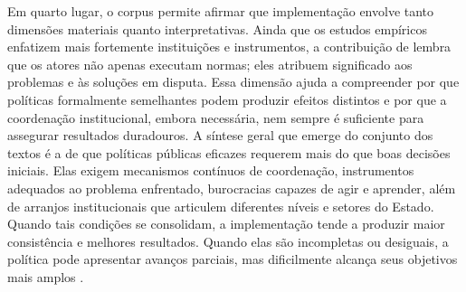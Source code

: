 \documentclass[12pt,a4paper]{article}
\begin{document}
Em quarto lugar, o corpus permite afirmar que implementação envolve tanto dimensões materiais quanto interpretativas. Ainda que os estudos empíricos enfatizem mais fortemente instituições e instrumentos, a contribuição de \textcite{dascenzi2013_implementacao_de} lembra que os atores não apenas executam normas; eles atribuem significado aos problemas e às soluções em disputa. Essa dimensão ajuda a compreender por que políticas formalmente semelhantes podem produzir efeitos distintos e por que a coordenação institucional, embora necessária, nem sempre é suficiente para assegurar resultados duradouros.
A síntese geral que emerge do conjunto dos textos é a de que políticas públicas eficazes requerem mais do que boas decisões iniciais. Elas exigem mecanismos contínuos de coordenação, instrumentos adequados ao problema enfrentado, burocracias capazes de agir e aprender, além de arranjos institucionais que articulem diferentes níveis e setores do Estado. Quando tais condições se consolidam, a implementação tende a produzir maior consistência e melhores resultados. Quando elas são incompletas ou desiguais, a política pode apresentar avanços parciais, mas dificilmente alcança seus objetivos mais amplos \autocites{dascenzi2013_implementacao_de}{bichir2020_sistemas_nacionais}{mello2017_evolucao_do}.
\end{document}
